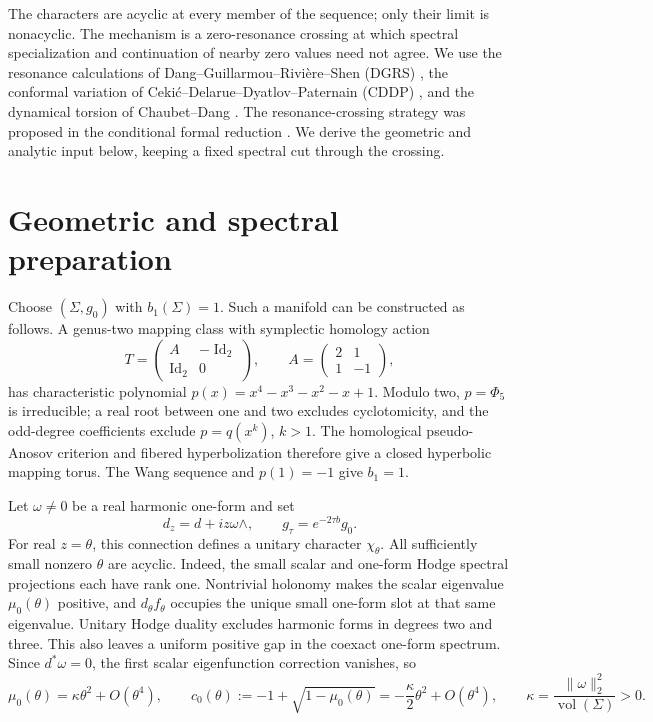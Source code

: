 \documentclass[11pt]{article}
\newcommand{\Id}{\operatorname{Id}}
\begin{document}
The characters are acyclic at every member of the sequence; only their
limit is nonacyclic. The mechanism is a zero-resonance crossing at which
spectral specialization and continuation of nearby zero values need not
agree. We use the resonance calculations of Dang--Guillarmou--Rivi\`ere--Shen
(DGRS) \cite{DGRS}, the conformal variation of
Ceki\'c--Delarue--Dyatlov--Paternain (CDDP) \cite{CDDP}, and the dynamical
torsion of Chaubet--Dang \cite{CD}.
The resonance-crossing strategy was proposed in the conditional formal
reduction \cite{Crossing}. We derive the geometric and analytic input
below, keeping a fixed spectral cut through the crossing.

\section{Geometric and spectral preparation}
Choose $(\Sigma,g_0)$ with $b_1(\Sigma)=1$. Such a manifold can be
constructed as follows. A genus-two mapping class with symplectic
homology action
\[
 T=\begin{pmatrix}A&-\Id_2\\ \Id_2&0\end{pmatrix},\qquad
 A=\begin{pmatrix}2&1\\1&-1\end{pmatrix},
\]
has characteristic polynomial $p(x)=x^4-x^3-x^2-x+1$. Modulo two,
$p=\Phi_5$ is irreducible; a real root between one and two excludes
cyclotomicity, and the odd-degree coefficients exclude $p=q(x^k)$,
$k>1$. The homological pseudo-Anosov criterion
\cite[Propositions 1--2]{MS} and fibered hyperbolization \cite{Thurston}
therefore give a closed hyperbolic mapping torus. The Wang sequence and
$p(1)=-1$ give $b_1=1$.

Let $\omega\ne0$ be a real harmonic one-form and set
\begin{equation}\label{family}
 d_z=d+iz\omega\wedge,\qquad g_\tau=e^{-2\tau b}g_0.
\end{equation}
For real $z=\theta$, this connection defines a unitary character
$\chi_\theta$. All sufficiently small nonzero $\theta$ are acyclic.
Indeed, the small scalar and one-form Hodge spectral projections each
have rank one. Nontrivial holonomy makes the scalar eigenvalue
$\mu_0(\theta)$ positive, and $d_\theta f_\theta$ occupies the unique
small one-form slot at that same eigenvalue. Unitary Hodge duality
excludes harmonic forms in degrees two and three. This also leaves a
uniform positive gap in the coexact one-form spectrum. Since
$d^*\omega=0$, the first scalar eigenfunction correction vanishes, so
\begin{equation}\label{c0}
 \mu_0(\theta)=\kappa\theta^2+O(\theta^4),\qquad
 c_0(\theta):=-1+\sqrt{1-\mu_0(\theta)}
       =-\frac\kappa2\theta^2+O(\theta^4),\qquad
 \kappa=\frac{\|\omega\|_2^2}{\operatorname{vol}(\Sigma)}>0.
\end{equation}
\end{document}
